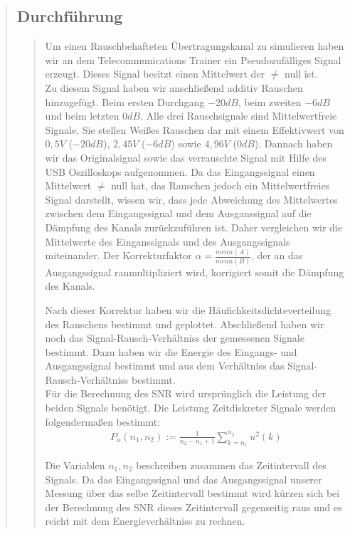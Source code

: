 \begin{quote}
    \subsection{Durchführung}
    \begin{quote}
        Um einen Rauschbehafteten Übertragungskanal zu simulieren haben wir an dem Telecommunications Trainer ein
        Pseudozufälliges Signal erzeugt. Dieses Signal besitzt einen Mittelwert der $\neq$ null ist.\\
        Zu diesem Signal haben wir anschließend additiv Rauschen hinzugefügt. Beim ersten Durchgang $-20dB$, beim
        zweiten $-6dB$ und beim letzten $0dB$. Alle drei Rauschsignale sind Mittelwertfreie Signale. Sie stellen Weißes
        Rauschen dar mit einem Effektivwert von $0,5 V$ ($-20dB$), $2,45V$ ($-6dB$)  sowie $4,96 V$ ($0 dB$).
        Dannach haben wir das Originalsignal sowie das verrauschte Signal mit Hilfe des USB Oszilloskops aufgenommen. 
        Da das Eingangssignal einen Mittelwert $\neq$ null hat, das Rauschen jedoch ein Mittelwertfreies Signal
        darstellt, wissen wir, dass jede Abweichung des Mittelwertes zwischen dem Eingangssignal und dem Ausganssignal
        auf die Dämpfung des Kanals zurückzuführen ist. Daher vergleichen wir die Mittelwerte des Einganssignals und des
        Ausgangssignals miteinander. Der Korrekturfaktor $\alpha = \frac{mean(A)}{mean(B)}$, der an das Ausgangssignal
        ranmultipliziert wird, korrigiert somit die Dämpfung des Kanals.\vspace{1em}
        
        Nach dieser Korrektur haben wir die Häufichkeitsdichteverteilung des Rauschens bestimmt und geplottet.
        Abschließend haben wir noch das Signal-Rausch-Verhältniss der gemessenen Signale bestimmt. Dazu haben wir die Energie des
        Eingangs- und Ausgangssignal bestimmt und aus dem Verhältniss das Signal-Rausch-Verhältniss bestimmt.\\
        Für die Berechnung des SNR wird ursprünglich die Leistung der beiden Signale benötigt. Die Leistung
        Zeitdiskreter Signale werden folgendermaßen bestimmt:
        \begin{equation*}
            \begin{split}
                P_u(n_1, n_2) := \frac{1}{n_2 - n_1 + 1} \sum_{k=n_1}^{n_2} u^2 (k)
            \end{split}
        \end{equation*}
        
        Die Variablen $n_1,n_2$ beschreiben zusammen das Zeitintervall des Signals. Da das Eingangssignal und das
        Ausgangssignal unserer Messung über das selbe Zeitintervall bestimmt wird kürzen sich bei der Berechnung des SNR
        dieses Zeitintervall gegenseitig raus und es reicht mit dem Energieverhältniss zu rechnen.\\


\end{quote}
\end{quote}
